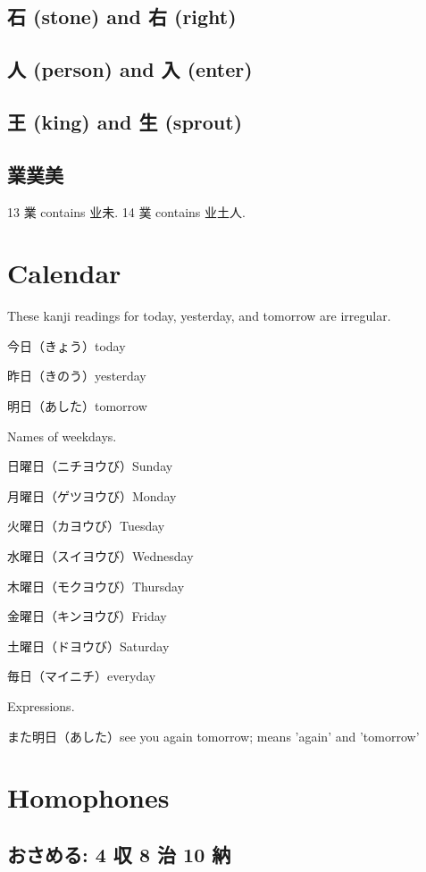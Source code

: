\subsection{石 (stone) and 右 (right)}

\subsection{人 (person) and 入 (enter)}

\subsection{王 (king) and 生 (sprout)}

\subsection{業菐美}

13 業 contains 业未.
14 菐 contains 业土人.

\section{Calendar}

These kanji readings for today, yesterday, and tomorrow are irregular.

今日（きょう）today

昨日（きのう）yesterday

明日（あした）tomorrow

Names of weekdays.

日曜日（ニチヨウび）Sunday

月曜日（ゲツヨウび）Monday

火曜日（カヨウび）Tuesday

水曜日（スイヨウび）Wednesday

木曜日（モクヨウび）Thursday

金曜日（キンヨウび）Friday

土曜日（ドヨウび）Saturday

毎日（マイニチ）everyday

Expressions.

また明日（あした）see you again tomorrow; means 'again' and 'tomorrow'

\section{Homophones}

\subsection{おさめる: 4 収 8 治 10 納}

